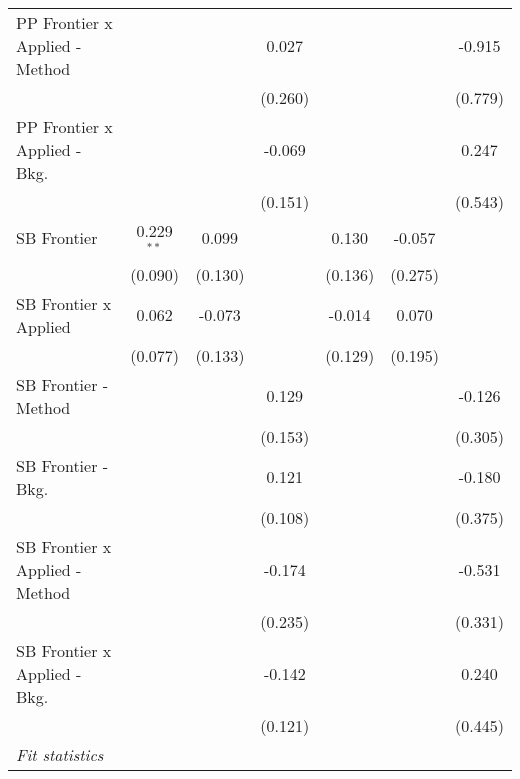 \begin{tabular}{lcccccc}
   PP Frontier x Applied - Method &               &               & 0.027       &               &         & -0.915\\   
                                  &               &               & (0.260)     &               &         & (0.779)\\   
   PP Frontier x Applied - Bkg.   &               &               & -0.069      &               &         & 0.247\\   
                                  &               &               & (0.151)     &               &         & (0.543)\\   
   SB Frontier                    & 0.229$^{**}$  & 0.099         &             & 0.130         & -0.057  &   \\   
                                  & (0.090)       & (0.130)       &             & (0.136)       & (0.275) &   \\   
   SB Frontier x Applied          & 0.062         & -0.073        &             & -0.014        & 0.070   &   \\   
                                  & (0.077)       & (0.133)       &             & (0.129)       & (0.195) &   \\   
   SB Frontier - Method           &               &               & 0.129       &               &         & -0.126\\   
                                  &               &               & (0.153)     &               &         & (0.305)\\   
   SB Frontier - Bkg.             &               &               & 0.121       &               &         & -0.180\\   
                                  &               &               & (0.108)     &               &         & (0.375)\\   
   SB Frontier x Applied - Method &               &               & -0.174      &               &         & -0.531\\   
                                  &               &               & (0.235)     &               &         & (0.331)\\   
   SB Frontier x Applied - Bkg.   &               &               & -0.142      &               &         & 0.240\\   
                                  &               &               & (0.121)     &               &         & (0.445)\\   
   \midrule
   \emph{Fit statistics}\\

\end{tabular}
